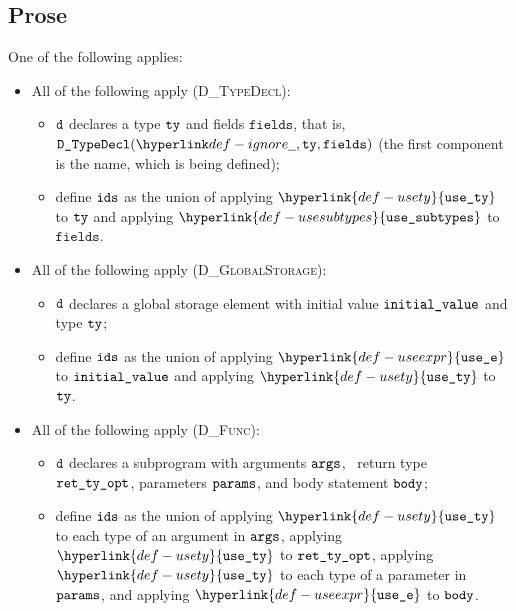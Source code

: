 \documentclass{book}
\newcommand\usety[0]{\hyperlink{def-usety}{\texttt{use\_ty}}}
\newcommand\usesubtypes[0]{\hyperlink{def-usesubtypes}{\texttt{use\_subtypes}}}
\newcommand\useexpr[0]{\hyperlink{def-useexpr}{\texttt{use\_e}}}
\newcommand\fields[0]{\texttt{fields}}
\begin{document}
\subsection{Prose}
One of the following applies:
\begin{itemize}
  \item All of the following apply (\textsc{D\_TypeDecl}):
  \begin{itemize}
    \item $\texttt{d}$ declares a type $\texttt{ty}$ and fields $\fields$, that is,
          $\DTypeDecl(\Ignore, \tty, \fields)$ (the first component is the name, which is being defined);
    \item define $\texttt{ids}$ as the union of applying $\usety$ to $\texttt{ty}$ and applying $\usesubtypes$ to $\fields$.
  \end{itemize}

  \item All of the following apply (\textsc{D\_GlobalStorage}):
  \begin{itemize}
    \item $\texttt{d}$ declares a global storage element with initial value $\texttt{initial\_value}$ and type $\texttt{ty}$;
    \item define $\texttt{ids}$ as the union of applying $\useexpr$ to $\texttt{initial\_value}$ and applying $\usety$ to $\texttt{ty}$.
  \end{itemize}

  \item All of the following apply (\textsc{D\_Func}):
  \begin{itemize}
    \item $\texttt{d}$ declares a subprogram with arguments $\texttt{args}$, \optional\ return type \\
          $\texttt{ret\_ty\_opt}$, parameters $\texttt{params}$, and body statement $\texttt{body}$;
    \item define $\texttt{ids}$ as the union of applying $\usety$ to each type of an argument in $\texttt{args}$,
          applying $\usety$ to $\texttt{ret\_ty\_opt}$, applying $\usety$ to each type of a parameter in $\texttt{params}$,
          and applying $\useexpr$ to $\texttt{body}$.
  \end{itemize}
\end{itemize}
\end{document}
